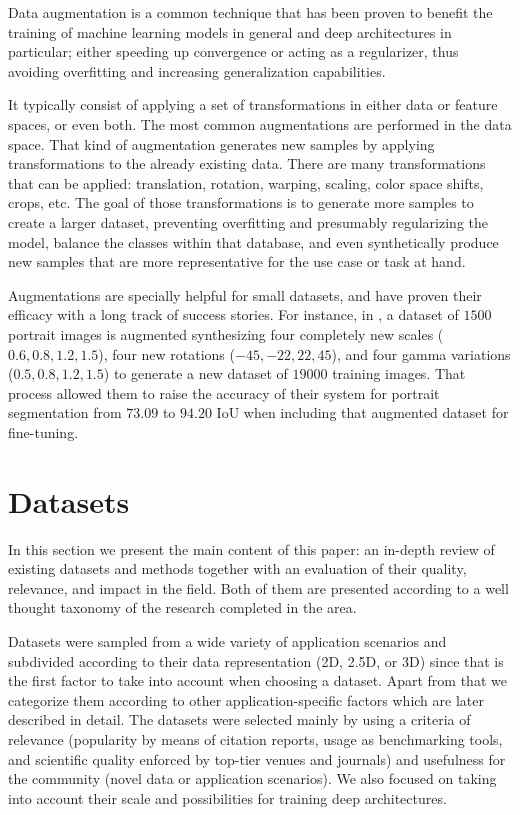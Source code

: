 Data augmentation is a common technique that has been proven to benefit the training of machine learning models in general and deep architectures in particular; either speeding up convergence or acting as a regularizer, thus avoiding overfitting and increasing generalization capabilities\cite{Wong2016}.

It typically consist of applying a set of transformations in either data or feature spaces, or even both. The most common augmentations are performed in the data space. That kind of augmentation generates new samples by applying transformations to the already existing data. There are many transformations that can be applied: translation, rotation, warping, scaling, color space shifts, crops, etc. The goal of those transformations is to generate more samples to create a larger dataset, preventing overfitting and presumably regularizing the model, balance the classes within that database, and even synthetically produce new samples that are more representative for the use case or task at hand.

Augmentations are specially helpful for small datasets, and have proven their efficacy with a long track of success stories. For instance, in \cite{Shen2016}, a dataset of $1500$ portrait images is augmented synthesizing four completely new scales ($0.6, 0.8, 1.2, 1.5$), four new rotations ($-45, -22, 22, 45$), and four gamma variations ($0.5, 0.8, 1.2, 1.5$) to generate a new dataset of $19000$ training images. That process allowed them to raise the accuracy of their system for portrait segmentation from $73.09$ to $94.20$ \ac{IoU} when including that augmented dataset for fine-tuning.

\section{Datasets}
\label{cha:semseg:sec:datasets}

In this section we present the main content of this paper: an in-depth review of existing datasets and methods together with an evaluation of their quality, relevance, and impact in the field. Both of them are presented according to a well thought taxonomy of the research completed in the area.

Datasets were sampled from a wide variety of application scenarios and subdivided according to their data representation (2D, 2.5D, or 3D) since that is the first factor to take into account when choosing a dataset. Apart from that we categorize them according to other application-specific factors which are later described in detail. The datasets were selected mainly by using a criteria of relevance (popularity by means of citation reports, usage as benchmarking tools, and scientific quality enforced by top-tier venues and journals) and usefulness for the community (novel data or application scenarios). We also focused on taking into account their scale and possibilities for training deep architectures.

